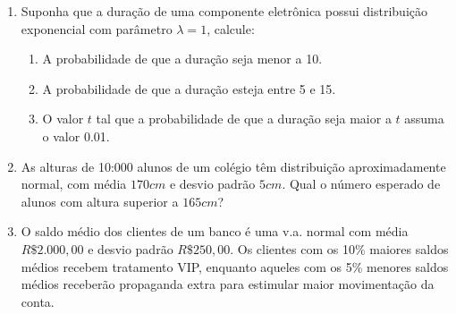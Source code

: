 \begin{enumerate}
\begin{enumerate}[label=\alph*)]
	\end{enumerate}

\setcounter{enumi}{2}
\item Suponha que a duração de uma componente eletrônica possui distribuição exponencial com parâmetro $\lambda = 1$, calcule:

	\solv{
		\[
			f(x) = \left\{
			\begin{array}{cc}
				\dfrac{1}{\lambda}e^{\frac{-x}{\lambda}}, & x>0;\\
				0, & c.c
			\end{array}\right.
			\hfill,\ \lambda = 1
		\]
	}
	\begin{enumerate}[label=\alph*)]
		\item A probabilidade de que a duração seja menor a 10.
		
		
		\item A probabilidade de que a duração esteja entre 5 e 15.
		
		
		\item O valor $t$ tal que a probabilidade de que a duração seja maior a $t$ assuma o valor 0.01.
		
	\end{enumerate}

\item As alturas de 10:000 alunos de um colégio têm distribuição aproximadamente normal, com média $170cm$ e desvio padrão $5cm$. Qual o número esperado de alunos com altura superior a $165cm$?


\setcounter{enumi}{10}
\item O saldo médio dos clientes de um banco é uma v.a. normal com média $R\$ 2.000,00$ e desvio padrão $R\$ 250,00$. Os clientes com os 10\% maiores saldos médios recebem tratamento VIP, enquanto aqueles com os 5\% menores saldos médios receberão propaganda extra para estimular maior movimentação da conta.


\end{enumerate}
